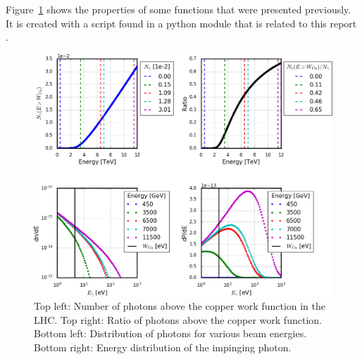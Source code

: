 Figure~\ref{fig:n_photons} shows the properties of some functions that were presented previously.
It is created with a script found in a python module that is related to this report \cite{cellinput}.
\begin{figure}[tbh]
    \centering
    \includegraphics[width=\textwidth]{./plots/n_photons.png}
    \caption{
        Top left: Number of photons above the copper work function in the LHC.
        Top right: Ratio of photons above the copper work function.
        Bottom left: Distribution of photons for various beam energies.
        Bottom right: Energy distribution of the impinging photon.
    }
    \label{fig:n_photons}
\end{figure}

